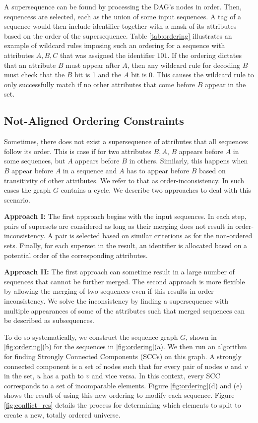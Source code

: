 A supersequence can be found by processing the DAG's nodes in order. Then, sequencess are selected, each as the union of some input sequences. A tag of a sequence would then include  identifier together with a mask of its attributes based on the order of the supersequence. 
Table \ref{tab:ordering} illustrates an example of  wildcard rules imposing such an ordering for a sequence with attributes $A, B, C$ that was assigned the identifier $101$. 
If the ordering dictates that an attribute $B$ must appear after $A$, then any wildcard rule for decoding $B$ must check that the $B$ bit is 1 and the $A$ bit is 0. This causes the wildcard rule to only successfully match if no other attributes that come before $B$ appear in the set. %

\subsection{Not-Aligned Ordering Constraints}
Sometimes, there does not exist a supersequence of attributes that all sequences follow its order. This is case  if for two attributes $B, A$,  $B$ appears before $A$ in some sequences, but $A$ appears before $B$ in others. Similarly, this happens when $B$ appear before $A$ in a sequence and $A$ has to appear before $B$ based on transitivity of other attributes. We refer to that as order-inconsistency.  In such cases the graph $G$ contains a cycle. We describe two approaches to deal with this scenario. 

\textbf{Approach I:} The first approach begins with the input sequences. In each step, pairs of supersets are considered as long as their merging does not result in order-inconsistency. A pair is selected based on similar criterions as for the non-ordered sets. Finally, for each superset in the result, an identifier is allocated based on a potential order of the corresponding attributes.

\textbf{Approach II:} The first approach can sometime result in a large number of sequences that cannot be further merged. The second approach is more flexible by allowing the merging of two sequences even if this results in order-inconsistency. We solve the inconsistency by finding a supersequence with multiple appearances of some of the attributes such that merged sequences can be described as subsequences. 

To do so systematically, we construct the sequence graph $G$, shown in \ref{fig:ordering}(b) for the sequences  in \ref{fig:ordering}(a). We then run an algorithm for finding Strongly Connected Components (SCCs) on this graph. A strongly connected component is a set of nodes such that for every pair of nodes $u$ and $v$ in the set, $u$ has a path to $v$ and vice versa. In this context, every SCC corresponds to a set of incomparable elements.  Figure \ref{fig:ordering}(d) and (e) shows the result of using this new ordering to modify each sequence.  
Figure \ref{fig:conflict_res} details the process for determining which elements to split to create a new, totally ordered universe.


